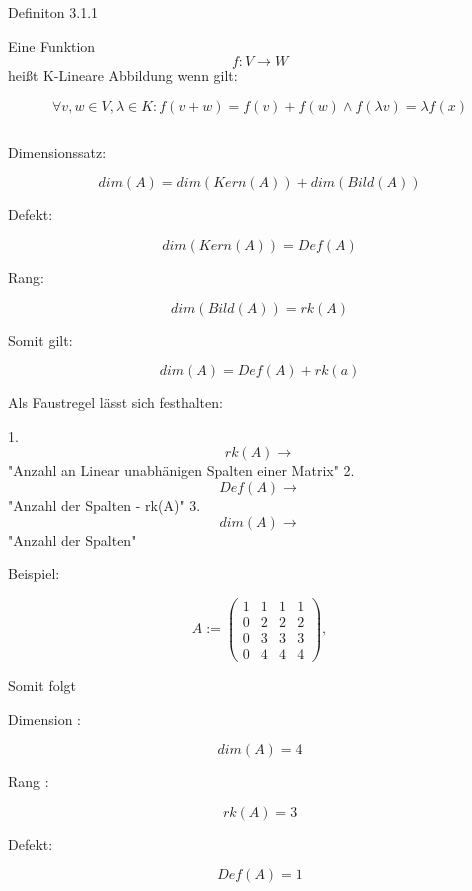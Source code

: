 Definiton 3.1.1 

Eine Funktion  $$f:V\rightarrow W$$ heißt K-Lineare Abbildung wenn gilt:

$$\forall v,w\in V, \lambda \in K : f(v+w) = f(v) + f(w) \wedge f(\lambda v) = \lambda f(x)$$ 


$$$$


Dimensionssatz:

$$dim(A)=dim(Kern(A))+dim(Bild(A))$$

Defekt:


$$dim(Kern(A)) = Def(A)$$

Rang:

$$dim(Bild(A))=rk(A)$$

Somit gilt:

$$dim(A)=Def(A)+rk(a)$$

Als Faustregel lässt sich festhalten:

1. $$rk(A)\rightarrow$$ "Anzahl an Linear unabhänigen Spalten einer Matrix"
2. $$Def(A) \rightarrow$$ "Anzahl der Spalten - rk(A)"
3. $$dim(A) \rightarrow$$ "Anzahl der Spalten"

Beispiel:


$$A:=\begin{pmatrix}
1&1&1&1\\
0&2&2&2\\
0&3&3&3\\
0&4&4&4
\end{pmatrix},$$

Somit folgt

Dimension : 

$$dim(A) = 4$$

Rang : 

$$rk(A) = 3$$

Defekt: 

$$Def(A) = 1$$

